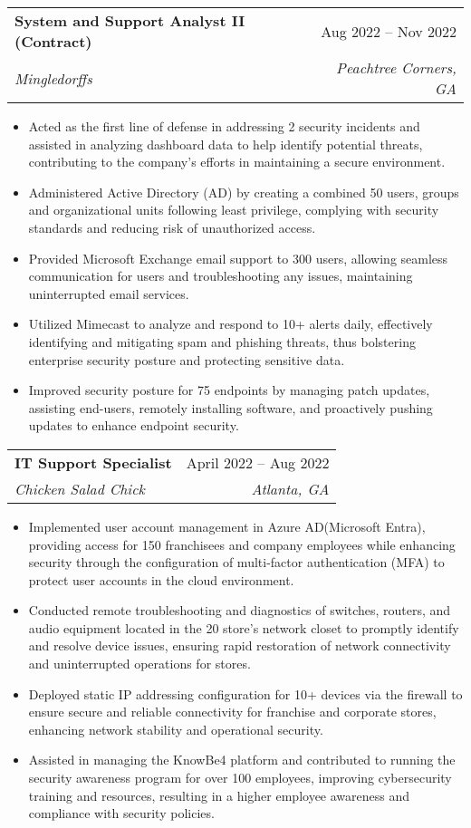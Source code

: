 \documentclass[letterpaper,10pt]{article}
\makeatletter
\newcommand{\resumeItem}[1]{
  \item\small{
    {#1 \vspace{-2pt}}
  }
}
\newcommand{\resumeSubheading}[4]{
  \vspace{-2pt}\item
    \begin{tabular*}{0.97\textwidth}[t]{l@{\extracolsep{\fill}}r}
      \textbf{#1} & #2 \\
      \textit{\small#3} & \textit{\small #4} \\
    \end{tabular*}\vspace{-7pt}
}
\newcommand{\resumeItemListStart}{\begin{itemize}}
\newcommand{\resumeItemListEnd}{\end{itemize}\vspace{-5pt}}
\makeatother
\begin{document}
    
    
    
    
    
    \resumeSubheading
      {System and Support Analyst II (Contract)}{Aug 2022 -- Nov 2022}
      {Mingledorffs}{Peachtree Corners, GA}
      \resumeItemListStart
        \resumeItem{Acted as the first line of defense in addressing 2 security incidents and assisted in analyzing dashboard data to help identify potential threats, contributing to the company's efforts in maintaining a secure environment.}
        \resumeItem{Administered Active Directory (AD) by creating a combined 50 users, groups and organizational units following least privilege, complying with security standards and reducing risk of unauthorized access.}
        \resumeItem{Provided Microsoft Exchange email support to 300 users, allowing seamless communication for users and troubleshooting any issues, maintaining uninterrupted email services.}
        \resumeItem{Utilized Mimecast to analyze and respond to 10+ alerts daily, effectively identifying and mitigating spam and phishing threats, thus bolstering enterprise security posture and protecting sensitive data.}
        \resumeItem{Improved security posture for 75 endpoints by managing patch updates, assisting end-users, remotely installing software, and proactively pushing updates to enhance endpoint security.} 
    \resumeItemListEnd

  \resumeSubheading
    {IT Support Specialist}{April 2022 -- Aug 2022}
    {Chicken Salad Chick}{Atlanta, GA}
    \resumeItemListStart
      \resumeItem{Implemented user account management in Azure AD(Microsoft Entra), providing access for 150 franchisees and company employees while enhancing security through the configuration of multi-factor authentication (MFA) to protect user accounts in the cloud environment.}
      \resumeItem{Conducted remote troubleshooting and diagnostics of switches, routers, and audio equipment located in the 20 store's network closet to promptly identify and resolve device issues, ensuring rapid restoration of network connectivity and uninterrupted operations for stores.}
      \resumeItem{Deployed static IP addressing configuration for 10+ devices via the firewall to ensure secure and reliable connectivity for franchise and corporate stores, enhancing network stability and operational security.}
      \resumeItem{Assisted in managing the KnowBe4 platform and contributed to running the security awareness program for over 100 employees, improving cybersecurity training and resources, resulting in a higher employee awareness and compliance with security policies.}
  \resumeItemListEnd
\end{document}
